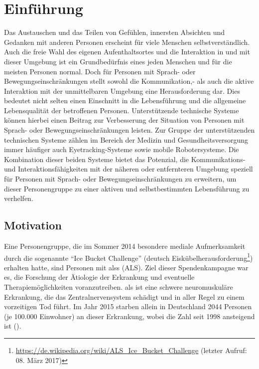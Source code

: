 

\chapter{Einführung}
\label{chapter:einfuehrung}

Das Austauschen und das Teilen von Gefühlen, innersten Absichten und Gedanken mit anderen Personen erscheint für viele Menschen selbstverständlich. Auch die freie Wahl des eigenen Aufenthaltsortes und die Interaktion in und mit dieser Umgebung ist ein Grundbedürfnis eines jeden Menschen und für die meisten Personen normal. Doch für Personen mit Sprach- oder Bewegungseinschränkungen stellt sowohl die Kommunikation,- als auch die aktive Interaktion mit der unmittelbaren Umgebung eine Herausforderung dar. Dies bedeutet nicht selten einen Einschnitt in die Lebensführung und die allgemeine Lebensqualität der betroffenen Personen. Unterstützende technische Systeme können hierbei einen Beitrag zur Verbesserung der Situation von Personen mit Sprach- oder Bewegungseinschränkungen leisten. Zur Gruppe der unterstützenden technischen Systeme zählen im Bereich der Medizin und Gesundheitsversorgung immer häufiger auch Eyetracking-Systeme sowie mobile Robotersysteme. Die Kombination dieser beiden Systeme bietet das Potenzial, die Kommunikations- und Interaktionsfähigkeiten mit der näheren oder entfernteren Umgebung speziell für Personen mit Sprach- oder Bewegungseinschränkungen zu erweitern, um dieser Personengruppe zu einer aktiven und selbstbestimmten Lebensführung zu verhelfen. 

\section{Motivation}
\label{section:motivation}

Eine Personengruppe, die im Sommer 2014 besondere mediale Aufmerksamkeit durch die sogenannte \enquote{Ice Bucket Challenge} (deutsch Eiskübelherausforderung\footnote{\url{https://de.wikipedia.org/wiki/ALS_Ice_Bucket_Challenge} (letzter Aufruf: 08. März 2017)}) erhalten hatte, sind Personen mit \aclp{als} (ALS). Ziel dieser Spendenkampagne war es, die Forschung \bzgl der Ätiologie der Erkrankung und eventuelle Therapiemöglichkeiten voranzutreiben. \acs{als} ist eine schwere neuromuskuläre Erkrankung, die das Zentralnervensystem schädigt und in aller Regel zu einem vorzeitigen Tod führt. Im Jahr 2015 starben allein in Deutschland 2044 Personen (je 100.000 Einwohner) an dieser Erkrankung, wobei die Zahl seit 1998 ansteigend ist (\vgl \cite{STAT2015}).

